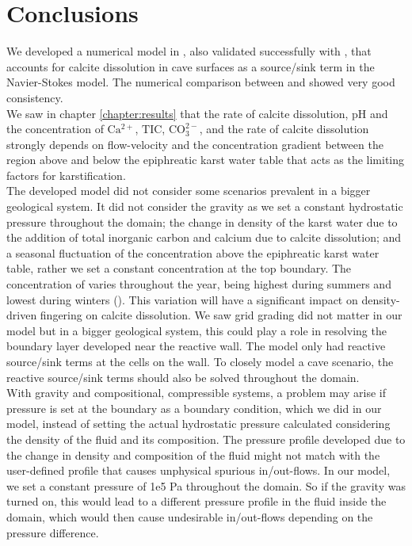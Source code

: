 \chapter{Conclusions} \label{chapter:conclusions}
\thispagestyle{empty}
We developed a numerical model in \DuMuX, also validated successfully with \MATLAB, that accounts for calcite dissolution 
in cave surfaces as a source/sink term in the Navier-Stokes model. The numerical 
comparison between \DuMuX and \MATLAB showed very good consistency.\\

We saw in chapter \ref{chapter:results} that the rate of calcite dissolution, pH and the 
concentration of $\mathrm{{Ca^{2+}}}$, $\mathrm{{TIC}}$, $\mathrm{{CO_3^{2-}}}$, and the rate of calcite dissolution strongly depends on 
flow-velocity and the concentration gradient between the region above and below the epiphreatic karst water table that 
acts as the limiting factors for karstification. \\

The developed model did not consider some scenarios prevalent in a bigger geological system. It did not consider the gravity 
as we set a constant hydrostatic pressure throughout the domain; the change in density of the karst water due to the addition of total inorganic carbon 
and calcium due to calcite dissolution; and a seasonal fluctuation of the  concentration above the epiphreatic karst water table, 
rather we set a constant concentration at the top boundary. The concentration of  varies throughout the year, being highest during summers and lowest during 
winters (). This variation will have a significant impact on density-driven fingering on calcite dissolution. 
We saw grid grading did not matter in our model but in a bigger geological system, this could play a role in resolving the boundary layer 
developed near the reactive wall. The \DuMuX model only had reactive source/sink terms at the cells on the wall. 
To closely model a cave scenario, the reactive source/sink terms should also be solved throughout the domain. \\

With gravity and compositional, compressible systems, a problem may arise if pressure is set at the boundary as a boundary condition, 
which we did in our model, instead of setting the actual hydrostatic pressure calculated considering the density of the fluid and its composition. 
The pressure profile developed due to the change in density and composition of the fluid might not match with the 
user-defined profile that causes unphysical spurious in/out-flows. 
In our \DuMuX model, we set a constant pressure of 1e5 Pa throughout the domain. So if the gravity was turned on, this would lead to a different 
pressure profile in the fluid inside the domain, which would then cause undesirable in/out-flows depending on the pressure 
difference. \\

